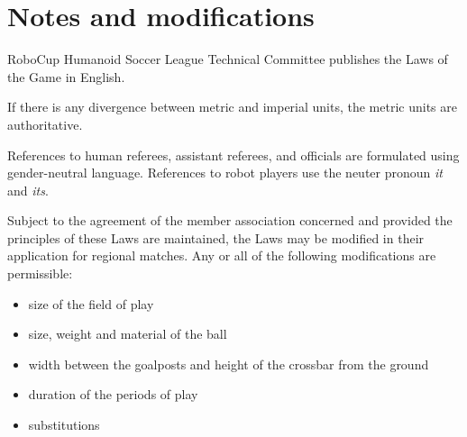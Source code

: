 \section{Notes and modifications}
\label{sec:modifications}

\label{sec:notes_on_the_laws}


RoboCup Humanoid Soccer League Technical Committee publishes the Laws of the Game in English.

If there is any divergence between metric and imperial units, the metric units are authoritative.

References to human referees, assistant referees, and officials are formulated using gender-neutral language.
References to robot players use the neuter pronoun \emph{it} and \emph{its}. 

Subject to the agreement of the member association concerned and provided the principles of these Laws are maintained, 
the Laws may be modified in their application for regional matches.
Any or all of the following modifications are permissible:
\begin{itemize}
    \item size of the field of play
    \item size, weight and material of the ball
    \item width between the goalposts and height of the crossbar from the ground
    \item duration of the periods of play
    \item substitutions
\end{itemize}


